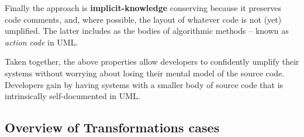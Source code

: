 Finally the approach is \textbf{implicit-knowledge} conserving because it preserves code comments, and, where possible, the layout of whatever code is not (yet) umplified. The latter includes as the bodies of algorithmic methods – known as \textit{action code} in UML.

Taken together, the above properties allow developers to confidently umplify their systems without worrying about losing their mental model of the source code. Developers gain by having systems with a smaller body of source code that is intrinsically self-documented in UML. 

\subsection{Overview of Transformations cases}

